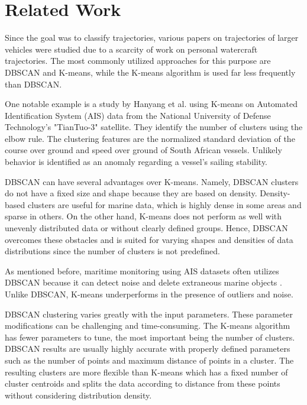 \documentclass[preprint,12pt]{elsarticle}
\begin{document}
\section{Related Work}
\label{sec:Related}

Since the goal was to classify trajectories, various papers on trajectories of larger vehicles were studied due to a scarcity of work on personal watercraft trajectories. The most commonly utilized approaches for this purpose are DBSCAN and K-means, while the K-means algorithm is used far less frequently than DBSCAN. 

One notable example is a study by Hanyang et al. \citep{2019Hanyang} using K-means on Automated Identification System (AIS) data from the National University of Defense Technology's "TianTuo-3" satellite. They identify the number of clusters using the elbow rule. The clustering features are the normalized standard deviation of the course over ground and speed over ground of South African vessels. Unlikely behavior is identified as an anomaly regarding a vessel's sailing stability.

DBSCAN can have several advantages over K-means. Namely, DBSCAN clusters do not have a fixed size and shape because they are based on density. Density-based clusters are useful for marine data, which is highly dense in some areas and sparse in others. On the other hand, K-means does not perform as well with unevenly distributed data or without clearly defined groups. Hence, DBSCAN overcomes these obstacles and is suited for varying shapes and densities of data distributions since the number of clusters is not predefined.

As mentioned before, maritime monitoring using AIS datasets often utilizes DBSCAN because it can detect noise and delete extraneous marine objects \citep{2018Coscia, 2018dAfflisio1, Ester1996ADA, Khan2004RealtimePO}. Unlike DBSCAN, K-means underperforms in the presence of outliers and noise.

DBSCAN clustering varies greatly with the input parameters. These parameter modifications can be challenging and time-consuming. The K-means algorithm has fewer parameters to tune, the most important being the number of clusters. DBSCAN results are usually highly accurate with properly defined parameters such as the number of points and maximum distance of points in a cluster. The resulting clusters are more flexible than K-means which has a fixed number of cluster centroids and splits the data according to distance from these points without considering distribution density.
\end{document}
